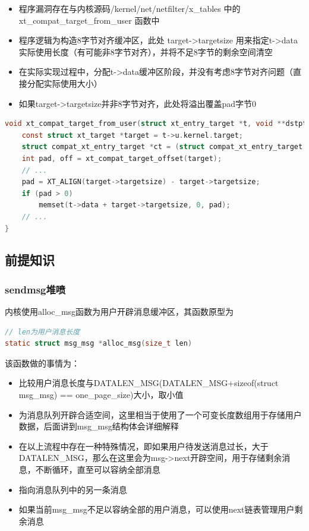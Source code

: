 \documentclass[xcolor=table]{beamer}
\begin{document}
\begin{frame}[fragile]

\footnotesize\begin{itemize}
	\item 程序漏洞存在与内核源码/kernel/net/netfilter/x\_tables 中的 xt\_compat\_target\_from\_user 函数中
	\item 程序逻辑为构造8字节对齐缓冲区，此处 target->targetsize 用来指定t->data实际使用长度（有可能非8字节对齐），并将不足8字节的剩余空间清空
	\item 在实际实现过程中，分配t->data缓冲区阶段，并没有考虑8字节对齐问题（直接分配实际使用大小）
	\item 如果target->targetsize并非8字节对齐，此处将溢出覆盖pad字节0
\end{itemize}


\tiny\begin{lstlisting}[language=c]
void xt_compat_target_from_user(struct xt_entry_target *t, void **dstptr, unsigned int *size) {
    const struct xt_target *target = t->u.kernel.target;
    struct compat_xt_entry_target *ct = (struct compat_xt_entry_target *) t;
    int pad, off = xt_compat_target_offset(target);
    // ...
    pad = XT_ALIGN(target->targetsize) - target->targetsize;
    if (pad > 0)
        memset(t->data + target->targetsize, 0, pad);
    // ...
}
\end{lstlisting}

\end{frame}


\subsection{前提知识}

\begin{frame}[fragile]
\frametitle{sendmsg堆喷}

\small{内核使用alloc\_msg函数为用户开辟消息缓冲区，其函数原型为}

\tiny\begin{lstlisting}[language=c]
// len为用户消息长度
static struct msg_msg *alloc_msg(size_t len)
\end{lstlisting}

\small{该函数做的事情为：}

\footnotesize\begin{itemize}
	\item 比较用户消息长度与DATALEN\_MSG(DATALEN\_MSG+sizeof(struct msg\_msg) == one\_page\_size)大小，取小值
	\item 为消息队列开辟合适空间，这里相当于使用了一个可变长度数组用于存储用户数据，后面讲到msg\_msg结构体会详细解释
	\item 在以上流程中存在一种特殊情况，即如果用户待发送消息过长，大于DATALEN\_MSG，那么在这里会为msg->next开辟空间，用于存储剩余消息，不断循环，直至可以容纳全部消息
	\item 指向消息队列中的另一条消息
	\item 如果当前msg\_msg不足以容纳全部的用户消息，可以使用next链表管理用户剩余消息
\end{itemize}


\end{frame}
\end{document}

